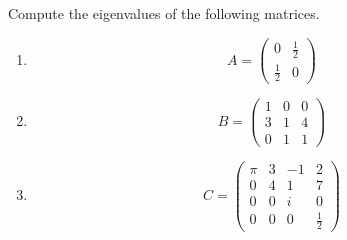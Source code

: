 Compute the eigenvalues of the following matrices.
\begin{enumerate}
	\item $$ A= 
		\begin{pmatrix}
		0&\frac{1}{2}\\
		\frac{1}{2}&0
		\end{pmatrix}
		$$
	\item
	$$ B=
	\begin{pmatrix}
	1&0&0\\
	3&1&4\\
	0&1&1
	\end{pmatrix}
	$$
		\item $$C=
	\begin{pmatrix}
	\pi& 3& -1& 2\\
	0 & 4& 1  & 7\\
	0 & 0& i  & 0\\
	0 & 0& 0  & \frac{1}{2}
	\end{pmatrix}
	$$

\end{enumerate}
 